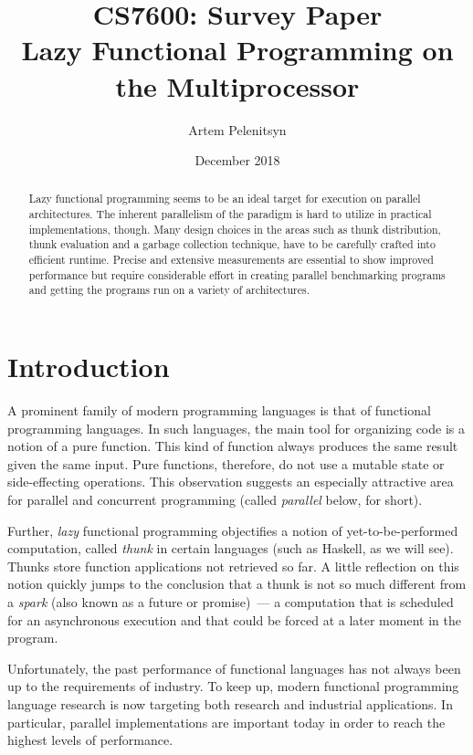 \documentclass[11pt]{extarticle}
\title{CS7600: Survey Paper\\Lazy Functional Programming on the Multiprocessor}
\author{Artem Pelenitsyn}
\date{December 2018}
\begin{document}
\maketitle

\begin{abstract}
Lazy functional programming seems to be an ideal target for execution on parallel architectures. The inherent parallelism of the paradigm is hard to utilize in practical implementations, though. Many design choices in the areas such as thunk distribution, thunk evaluation and a garbage collection technique, have to be carefully crafted into efficient runtime. Precise and extensive measurements are essential to show improved performance but require considerable effort in creating parallel benchmarking programs and getting the programs run on a variety of architectures.
\end{abstract}


\section{Introduction}

A prominent family of modern programming languages is that of functional programming languages. In such languages, the main tool for organizing code is a notion of a pure function. This kind of function always produces the same result given the same input. Pure functions, therefore, do not use a mutable state or side-effecting operations. This observation suggests an especially attractive area for parallel and concurrent programming (called \textit{parallel} below, for short).

Further, \emph{lazy} functional programming objectifies a notion of yet-to-be-performed computation, called \emph{thunk} in certain languages (such as Haskell, as we will see). Thunks store function applications not retrieved so far. A little reflection on this notion quickly jumps to the conclusion that a thunk is not so much different from a \emph{spark} (also known as a future or promise)~--- a computation that is scheduled for an asynchronous execution and that could be forced at a later moment in the program.

Unfortunately, the past performance of functional languages has not always been up to the requirements of industry.
To keep up, modern functional programming language research is now targeting both research and industrial applications.
In particular, 
parallel implementations are important today in order to reach the highest levels of performance. 
\end{document}
